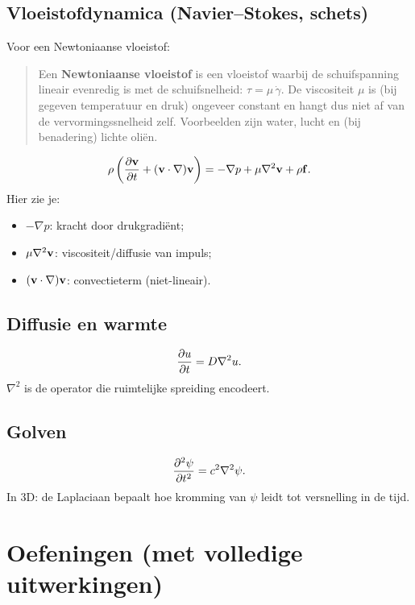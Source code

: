 \documentclass[11pt,a4paper]{article}
\begin{document}
    \subsection{Vloeistofdynamica (Navier--Stokes, schets)}
    Voor een Newtoniaanse vloeistof:
    \begin{quote}
        Een \textbf{Newtoniaanse vloeistof} is een vloeistof waarbij de schuifspanning lineair evenredig is met de schuifsnelheid:
        \(\tau = \mu\,\dot\gamma\). De viscositeit \(\mu\) is (bij gegeven temperatuur en druk) ongeveer constant en hangt dus niet af van de vervormingssnelheid zelf.
        Voorbeelden zijn water, lucht en (bij benadering) lichte oli\"en.
    \end{quote}
    \begin{equation}
        \rho\left(\pdv{\vb{v}}{t}+(\vb{v}\cdot\nabla)\vb{v}\right)
        = -\nabla p + \mu \nabla^2 \vb{v} + \rho \vb{f}.
    \end{equation}
    Hier zie je:
    \begin{itemize}
        \item \(-\nabla p\): kracht door drukgradi\"ent;
        \item \(\mu\nabla^2\vb{v}\): viscositeit/diffusie van impuls;
        \item \((\vb{v}\cdot\nabla)\vb{v}\): convectieterm (niet-lineair).
    \end{itemize}

    \subsection{Diffusie en warmte}
    \begin{equation}
        \pdv{u}{t} = D\nabla^2 u.
    \end{equation}
    \(\nabla^2\) is de operator die ruimtelijke spreiding encodeert.

    \subsection{Golven}
    \begin{equation}
        \pdv[2]{\psi}{t} = c^2 \nabla^2 \psi.
    \end{equation}
    In 3D: de Laplaciaan bepaalt hoe kromming van \(\psi\) leidt tot versnelling in de tijd.



    \section{Oefeningen (met volledige uitwerkingen)}
\end{document}
